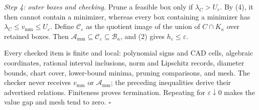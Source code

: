 \emph{Step 4: outer boxes and checking.}
Prune a feasible box only if \(\lambda_C>U_\varepsilon\).  By (4), it then cannot contain a minimizer, whereas every box containing a minimizer has \(\lambda_C\le v_{\mathrm{mm}}\le U_\varepsilon\).  Define \(\mathcal C_\varepsilon\) as the quotient image of the union of \(C\cap K_\kappa\) over retained boxes.  Then \(\mathcal A_{\mathrm{mm}}\subseteq\mathcal C_\varepsilon\subseteq\mathcal B_\kappa\), and (2) gives \(h_\varepsilon\le\varepsilon\).

Every checked item is finite and local: polynomial signs and CAD cells, algebraic coordinates, rational interval inclusions, norm and Lipschitz records, diameter bounds, chart cover, lower-bound minima, pruning comparisons, and mesh.  The checker never receives \(v_{\mathrm{mm}}\) or \(\mathcal A_{\mathrm{mm}}\); the preceding inequalities derive their advertised relations.  Finiteness proves termination.  Repeating for \(\varepsilon\downarrow0\) makes the value gap and mesh tend to zero. \(\square\)